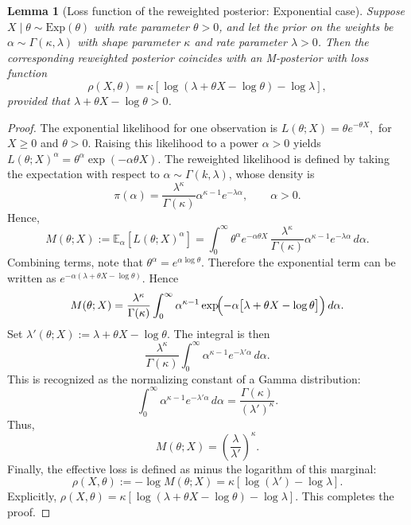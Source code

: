 \documentclass[11pt, oneside]{amsart}
\newtheorem{lemma}{Lemma}
\theoremstyle{definition}   %
\begin{document}
%
\begin{lemma}[Loss function of the reweighted posterior: Exponential case]
\label{lemma::calculation-reweighted-posterior-exponential}
    Suppose \(X \mid \theta \sim \mathrm{Exp}(\theta)\) with rate parameter \(\theta>0\), 
    and let the prior on the weights be \(\alpha \sim \Gamma(\kappa,\lambda)\) 
    with shape parameter \(\kappa\) and rate parameter \(\lambda>0\).
    Then the corresponding reweighted posterior coincides with an M-posterior with loss function
    \[
        \rho(X, \theta) 
        = \kappa\left[ \log \left(\lambda + \theta X - \log \theta \right) - \log \lambda \right],
    \]
    provided that \(\lambda + \theta X - \log\theta > 0\).
\end{lemma}
%
\begin{proof}
    The exponential likelihood for one observation is $L(\theta;X) = \theta e^{-\theta X},$ for $X \geq 0$ and $\theta>0$.
    Raising this likelihood to a power \(\alpha > 0\) yields $
        L(\theta;X)^\alpha = \theta^\alpha \exp(-\alpha \theta X).$
    The reweighted likelihood is defined by taking the expectation with respect to 
    \(\alpha \sim \Gamma(k,\lambda)\), whose density is
    \[
        \pi(\alpha) = \frac{\lambda^\kappa}{\Gamma(\kappa)} \alpha^{\kappa-1} e^{-\lambda \alpha}, 
        \qquad \alpha>0.
    \]
    Hence,
    \[
        M(\theta;X) := \mathbb{E}_\alpha[L(\theta;X)^\alpha]
        = \int_0^\infty \theta^\alpha e^{-\alpha \theta X}\, 
          \frac{\lambda^\kappa}{\Gamma(\kappa)} \alpha^{\kappa-1} e^{-\lambda \alpha}\, d\alpha.
    \]
    Combining terms, note that \(\theta^\alpha = e^{\alpha \log \theta}\). 
    Therefore the exponential term can be written as
    $e^{-\alpha(\lambda + \theta X - \log \theta)}.$
    Hence
    \[
        M(\theta;X) 
        = \frac{\lambda^\kappa}{\Gamma(\kappa)} \int_0^\infty \alpha^{\kappa-1} 
          \exp\!\Bigl(-\alpha\bigl[\lambda + \theta X - \log \theta \bigr]\Bigr)\, d\alpha.
    \]
    Set
    $\lambda'(\theta;X) := \lambda + \theta X - \log \theta.$
    The integral is then
    \[
        \frac{\lambda^\kappa}{\Gamma(\kappa)} \int_0^\infty \alpha^{\kappa-1} e^{-\lambda' \alpha}\, d\alpha.
    \]
    This is recognized as the normalizing constant of a Gamma distribution:
    \[
        \int_0^\infty \alpha^{\kappa-1} e^{-\lambda' \alpha}\, d\alpha = \frac{\Gamma(\kappa)}{(\lambda')^\kappa}.
    \]
    Thus,
    \[
        M(\theta;X) = \left(\frac{\lambda}{\lambda'}\right)^\kappa.
    \]
    Finally, the effective loss is defined as minus the logarithm of this marginal:
    \[
        \rho(X, \theta) := -\log M(\theta;X) = \kappa\left[\log(\lambda') - \log \lambda\right].
    \]
    Explicitly,
    $\rho(X, \theta) 
        = \kappa\left[ \log \left(\lambda + \theta X - \log \theta \right) - \log \lambda \right].$
    This completes the proof.
\end{proof}
%
%
\end{document}
